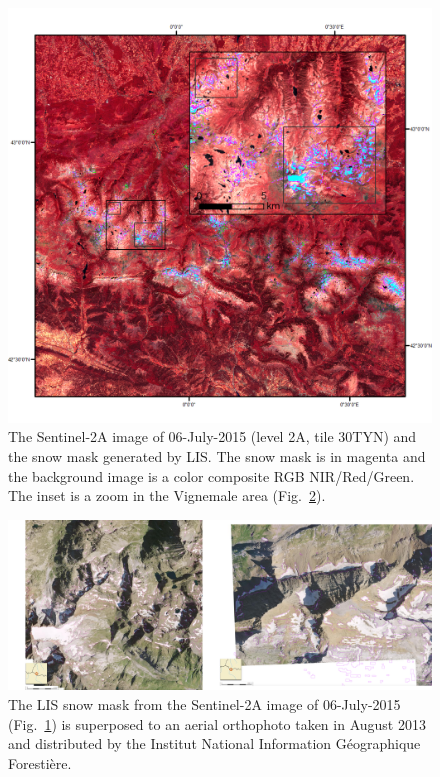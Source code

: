 \documentclass[a4paper]{article}
\begin{document}
\begin{figure}[h]
 \centering
 \includegraphics[width=\textwidth]{./images/S2snow.png}
 \caption{The Sentinel-2A image of 06-July-2015 (level 2A, tile 30TYN) and the snow mask generated by LIS. The snow mask is in magenta and the background image is a color composite RGB NIR/Red/Green. The inset is a zoom in the Vignemale area (Fig.~\ref{fig:S2snowzoom}).}
 \label{fig:S2snow}
\end{figure}

\begin{figure}[h]
 \centering
 \includegraphics[width=\textwidth]{./images/Sentinel2_testmontage.png}
 \caption{The LIS snow mask from the Sentinel-2A image of 06-July-2015 (Fig.~\ref{fig:S2snow}) is superposed to an aerial orthophoto taken in August 2013 and distributed by the Institut National Information Géographique Forestière.}
 \label{fig:S2snowzoom}
\end{figure}
\end{document}
